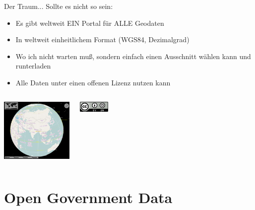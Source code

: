 \documentclass{beamer}
\begin{document}
\begin{frame}{Der Traum...}
	Sollte es nicht so sein:
	\begin{itemize}
		\item Es gibt weltweit EIN Portal für ALLE Geodaten
		\item In weltweit einheitlichem Format (WGS84, Dezimalgrad)
		\item Wo ich nicht warten muß, sondern einfach einen Ausschnitt wählen kann und runterladen
		\item Alle Daten unter einen offenen Lizenz nutzen kann
	\end{itemize}

	\begin{columns}[c] %
		    \begin{center}
	\includegraphics[width=3.5cm]{marble.png}
	\end{center}
	    \begin{center}
		\includegraphics[width=1.5cm]{cc-by-sa.png}
	\end{center}
\end{columns}

\end{frame}

\section{Open Government Data}
\end{document}
